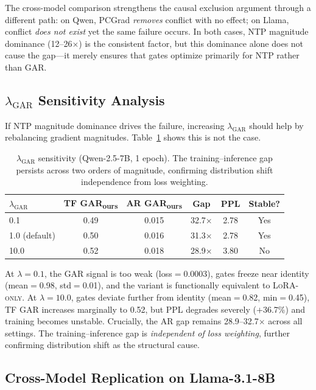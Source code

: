 \documentclass[11pt]{article}
\newcommand{\gar}{\textsc{GAR}}
\newcommand{\garours}{\textsc{GAR}\textsubscript{ours}}
\newcommand{\lo}{\textsc{LoRA-only}}
\begin{document}
The cross-model comparison strengthens the causal exclusion argument through a different path: on Qwen, PCGrad \emph{removes} conflict with no effect; on Llama, conflict \emph{does not exist} yet the same failure occurs. In both cases, NTP magnitude dominance (12--26$\times$) is the consistent factor, but this dominance alone does not cause the gap---it merely ensures that gates optimize primarily for NTP rather than \gar{}.

\subsection{$\lambda_{\text{GAR}}$ Sensitivity Analysis}
\label{sec:lambda}

If NTP magnitude dominance drives the failure, increasing $\lambda_{\text{GAR}}$ should help by rebalancing gradient magnitudes. Table~\ref{tab:lambda} shows this is not the case.

\begin{table}[t]
\centering
\small
\caption{$\lambda_{\text{GAR}}$ sensitivity (Qwen-2.5-7B, 1 epoch). The training--inference gap persists across two orders of magnitude, confirming distribution shift independence from loss weighting.}
\label{tab:lambda}
\begin{tabular}{lccccc}
\toprule
$\lambda_{\text{GAR}}$ & \textbf{TF \garours{}} & \textbf{AR \garours{}} & \textbf{Gap} & \textbf{PPL} & \textbf{Stable?} \\
\midrule
0.1 & 0.49 & 0.015 & 32.7$\times$ & 2.78 & Yes \\
1.0 (default) & 0.50 & 0.016 & 31.3$\times$ & 2.78 & Yes \\
10.0 & 0.52 & 0.018 & 28.9$\times$ & 3.80 & No \\
\bottomrule
\end{tabular}
\end{table}

At $\lambda=0.1$, the \gar{} signal is too weak (loss$=$0.0003), gates freeze near identity (mean$=$0.98, std$=$0.01), and the variant is functionally equivalent to \lo{}. At $\lambda=10.0$, gates deviate further from identity (mean$=$0.82, min$=$0.45), TF \gar{} increases marginally to 0.52, but PPL degrades severely ($+$36.7\%) and training becomes unstable. Crucially, the AR gap remains 28.9--32.7$\times$ across all settings. The training--inference gap is \emph{independent of loss weighting}, further confirming distribution shift as the structural cause.

\subsection{Cross-Model Replication on Llama-3.1-8B}
\label{sec:cross_model}
\end{document}
